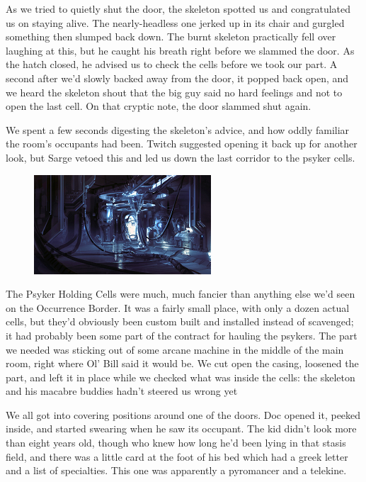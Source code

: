 As we tried to quietly shut the door, the skeleton spotted us and congratulated us on staying alive. 
The nearly-headless one jerked up in its chair and gurgled something then slumped back down. 
The burnt skeleton practically fell over laughing at this, but he caught his breath right before we slammed the door. 
As the hatch closed, he advised us to check the cells before we took our part. 
A second after we’d slowly backed away from the door, it popped back open, and we heard the skeleton shout that the big guy said no hard feelings and not to open the last cell. 
On that cryptic note, the door slammed shut again.

We spent a few seconds digesting the skeleton’s advice, and how oddly familiar the room’s occupants had been. 
Twitch suggested opening it back up for another look, but Sarge vetoed this and led us down the last corridor to the psyker cells.

\begin{figure}
	\begin{center}
		\includegraphics[width=\figwidth]{pics/7/38.png}
	\end{center}
\end{figure}
The Psyker Holding Cells were much, much fancier than anything else we’d seen on the Occurrence Border. 
It was a fairly small place, with only a dozen actual cells, but they’d obviously been custom built and installed instead of scavenged; 
it had probably been some part of the contract for hauling the psykers. 
The part we needed was sticking out of some arcane machine in the middle of the main room, right where Ol’ Bill said it would be. 
We cut open the casing, loosened the part, and left it in place while we checked what was inside the cells: 
the skeleton and his macabre buddies hadn’t steered us wrong yet 

We all got into covering positions around one of the doors. 
Doc opened it, peeked inside, and started swearing when he saw its occupant. 
The kid didn’t look more than eight years old, though who knew how long he’d been lying in that stasis field, and there was a little card at the foot of his bed which had a greek letter and a list of specialties. 
This one was apparently a pyromancer and a telekine.

